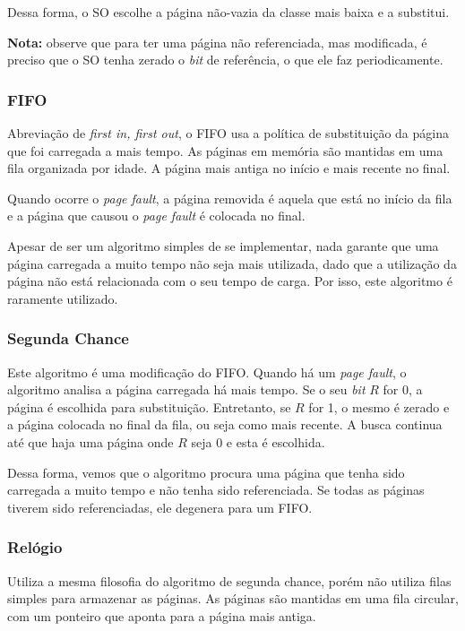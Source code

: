 Dessa forma, o SO escolhe a página não-vazia da classe mais baixa e a substitui.

\textbf{Nota:} observe que para ter uma página não referenciada, mas modificada, é preciso que o SO tenha zerado o \textit{bit} de referência, o que ele faz periodicamente.



\subsubsection{FIFO}
Abreviação de \textit{first in, first out}, o FIFO usa a política de substituição da página que foi carregada a mais tempo. As páginas em memória são mantidas em uma fila organizada por idade. A página mais antiga no início e mais recente no final.

Quando ocorre o \textit{page fault}, a página removida é aquela que está no início da fila e a página que causou o \textit{page fault} é colocada no final.

Apesar de ser um algoritmo simples de se implementar, nada garante que uma página carregada a muito tempo não seja mais utilizada, dado que a utilização da página não está relacionada com o seu tempo de carga. Por isso, este algoritmo é raramente utilizado.




\subsubsection{Segunda Chance}
Este algoritmo é uma modificação do FIFO. Quando há um \textit{page fault}, o algoritmo analisa a página carregada há mais tempo. Se o seu \textit{bit} $R$ for 0, a página é escolhida para substituição. Entretanto, se $R$ for 1, o mesmo é zerado e a página colocada no final da fila, ou seja como mais recente. A busca continua até que haja uma página onde $R$ seja 0 e esta é escolhida.

Dessa forma, vemos que o algoritmo procura uma página que tenha sido carregada a muito tempo e não tenha sido referenciada. Se todas as páginas tiverem sido referenciadas, ele degenera para um FIFO.


\subsubsection{Relógio}
Utiliza a mesma filosofia do algoritmo de segunda chance, porém não utiliza filas simples para armazenar as páginas. As páginas são mantidas em uma fila circular, com um ponteiro que aponta para a página mais antiga.

